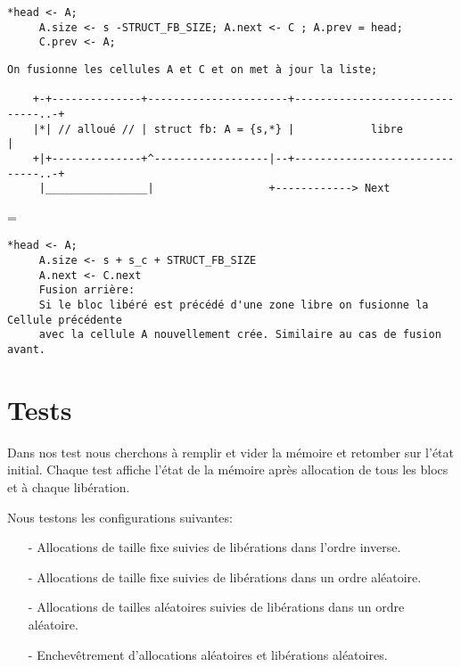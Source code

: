 \documentclass[11pt]{article}
\newenvironment{absolutelynopagebreak}
  {\par\nobreak\vfil\penalty0\vfilneg
   \vtop\bgroup}
  {\par\xdef\tpd{\the\prevdepth}\egroup
   \prevdepth=\tpd}
\theoremstyle{definition}
\begin{document}
\begin{lstlisting}[columns=fixed,basicstyle=\scriptsize\ttfamily]
     *head <- A;
     A.size <- s -STRUCT_FB_SIZE; A.next <- C ; A.prev = head;
     C.prev <- A;
\end{lstlisting}

\begin{absolutelynopagebreak}
\begin{lstlisting}[columns=fixed,basicstyle=\scriptsize\ttfamily]
    On fusionne les cellules A et C et on met à jour la liste;

    +-+--------------+----------------------+------------------------------..-+
    |*| // alloué // | struct fb: A = {s,*} |            libre                |
    +|+--------------+^------------------|--+------------------------------..-+
     |________________|                  +------------> Next
\end{lstlisting}
\end{absolutelynopagebreak}

\begin{lstlisting}[columns=fixed,basicstyle=\scriptsize\ttfamily]
     *head <- A;
     A.size <- s + s_c + STRUCT_FB_SIZE
     A.next <- C.next
     Fusion arrière:
     Si le bloc libéré est précédé d'une zone libre on fusionne la Cellule précédente
     avec la cellule A nouvellement crée. Similaire au cas de fusion avant.
\end{lstlisting}

\section{Tests}
Dans nos test nous cherchons à remplir et vider la mémoire et retomber sur l'état initial.
Chaque test affiche l'état de la mémoire après allocation de tous les blocs et à chaque libération.

Nous testons les configurations suivantes:
\begin{itemize}
\item[-] Allocations de taille fixe suivies de libérations dans l'ordre inverse.
\item[-] Allocations de taille fixe suivies de libérations dans un ordre aléatoire.
\item[-] Allocations de tailles aléatoires suivies de libérations dans un ordre aléatoire.
\item[-] Enchevêtrement d'allocations aléatoires et libérations aléatoires.
\end{itemize}
\end{document}
